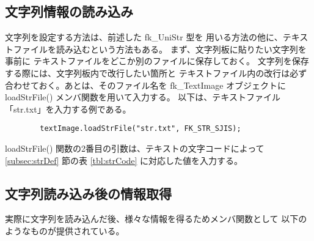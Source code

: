 \subsection{文字列情報の読み込み}
文字列を設定する方法は、前述した fk\_UniStr 型を
用いる方法の他に、テキストファイルを読み込むという方法もある。
まず、文字列板に貼りたい文字列を事前に
テキストファイルをどこか別のファイルに保存しておく。
文字列を保存する際には、文字列板内で改行したい箇所と
テキストファイル内の改行は必ず合わせておく。あとは、そのファイル名を
fk\_TextImage オブジェクトに loadStrFile() メンバ関数を用いて入力する。
以下は、テキストファイル「str.txt」を入力する例である。
\\
\begin{screen}
\begin{verbatim}
        textImage.loadStrFile("str.txt", FK_STR_SJIS);
\end{verbatim}
\end{screen}
loadStrFile() 関数の2番目の引数は、テキストの文字コードによって
\ref{subsec:strDef} 節の表 \ref{tbl:strCode} に対応した値を入力する。

\subsection{文字列読み込み後の情報取得}
実際に文字列を読み込んだ後、様々な情報を得るためメンバ関数として
以下のようなものが提供されている。

